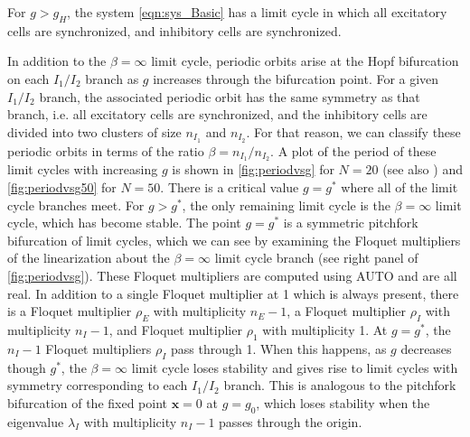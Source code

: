 \documentclass[reqno]{siamonline190516}
\newcommand{\xvec}{\mathbf{x}}
\begin{document}
\begin{proposition}\label{prop:limitcycle}
For $g > g_H$, the system \cref{eqn:sys_Basic} has a limit cycle in which all excitatory cells are synchronized, and inhibitory cells are synchronized.
\end{proposition}

In addition to the $\beta = \infty$ limit cycle, periodic orbits arise at the Hopf bifurcation on each $I_1/I_2$ branch as $g$ increases through the bifurcation point. For a given $I_1/I_2$ branch, the associated periodic orbit has the same symmetry as that branch, i.e. all excitatory cells are synchronized, and the inhibitory cells are divided into two clusters of size $n_{I_1}$ and $n_{I_2}$. For that reason, we can classify these periodic orbits in terms of the ratio $\beta = n_{I_1}/n_{I_2}$. A plot of the period of these limit cycles with increasing $g$ is shown in \cref{fig:periodvsg} for $N=20$ (see also \cite[Fig. 2]{Barreiro2017}) and \cref{fig:periodvsg50} for $N=50$. There is a critical value $g = g^*$ where all of the limit cycle branches meet. For $g > g^*$, the only remaining limit cycle is the $\beta = \infty$ limit cycle, which has become stable. The point $g = g^*$ is a symmetric pitchfork bifurcation of limit cycles, which we can see by examining the Floquet multipliers of the linearization about the $\beta = \infty$ limit cycle branch (see right panel of \cref{fig:periodvsg}). These Floquet multipliers are computed using AUTO and are all real. In addition to a single Floquet multiplier at 1 which is always present, there is a Floquet multiplier $\rho_E$ with multiplicity $n_E - 1$, a Floquet multiplier $\rho_I$ with multiplicity $n_I - 1$, and Floquet multiplier $\rho_1$ with multiplicity 1. At $g = g^*$, the $n_I - 1$ Floquet multipliers $\rho_I$ pass through 1. When this happens, as $g$ decreases though $g^*$, the $\beta = \infty$ limit cycle loses stability and gives rise to limit cycles with symmetry corresponding to each $I_1/I_2$ branch. This is analogous to the pitchfork bifurcation of the fixed point $\xvec = 0$ at $g = g_0$, which loses stability when the eigenvalue $\lambda_I$ with multiplicity $n_I - 1$ passes through the origin.
\end{document}
